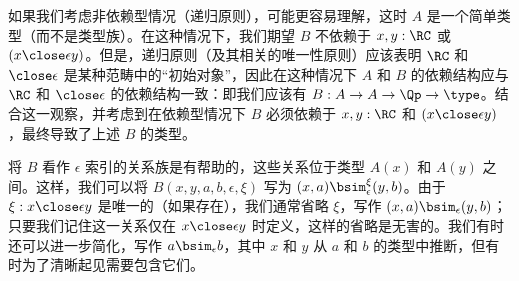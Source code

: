 如果我们考虑非依赖型情况（递归原则），可能更容易理解，这时 $A$ 是一个简单类型（而不是类型族）。在这种情况下，我们期望 $B$ 不依赖于 $x,y:\RC$ 或 $(x\close\epsilon y)$。但是，递归原则（及其相关的唯一性原则）应该表明 $\RC$ 和 $\close\epsilon$ 是某种范畴中的“初始对象”，因此在这种情况下 $A$ 和 $B$ 的依赖结构应与 $\RC$ 和 $\close\epsilon$ 的依赖结构一致：即我们应该有 $B:A\to A\to \Qp \to \type$。结合这一观察，并考虑到在依赖型情况下 $B$ 必须依赖于 $x,y:\RC$ 和 $(x\close\epsilon y)$，最终导致了上述 $B$ 的类型。

将 $B$ 看作 $\epsilon$ 索引的关系族是有帮助的，这些关系位于类型 $A(x)$ 和 $A(y)$ 之间。这样，我们可以将 $B(x,y,a,b,\epsilon,\xi)$ 写为 $(x,a) \bsim_\epsilon^\xi (y,b)$。由于 $\xi:x\close\epsilon y$ 是唯一的（如果存在），我们通常省略 $\xi$，写作 $(x,a) \bsim_\epsilon (y,b)$；只要我们记住这一关系仅在 $x\close\epsilon y$ 时定义，这样的省略是无害的。我们有时还可以进一步简化，写作 $a\bsim_\epsilon b$，其中 $x$ 和 $y$ 从 $a$ 和 $b$ 的类型中推断，但有时为了清晰起见需要包含它们。

